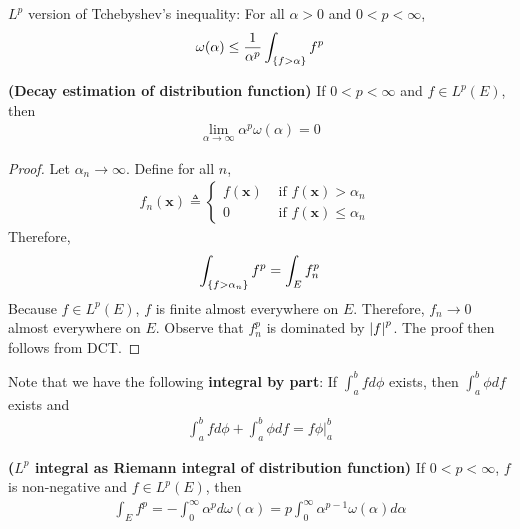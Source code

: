 \documentclass{report}
\begin{document}
\begin{mdframed}
$L^p$ version of Tchebyshev's inequality:  For all $\alpha >0$ and $0<p <\infty$, 
\begin{align*}
\omega (\alpha )\leq  \frac{1}{\alpha ^p}  \int_{\{ f>\alpha  \}}f^p
\end{align*}
\end{mdframed}
\begin{theorem}
\label{Deod}
 \textbf{(Decay estimation of distribution function)} If $0<p<\infty$ and $f\in L^p(E)$, then 
\begin{align*}
\lim_{\alpha \to \infty} \alpha ^p \omega (\alpha )=0 
\end{align*}
\end{theorem}
\begin{proof}
Let $\alpha_n \to \infty$. Define for all $n$, 
 \begin{align*}
f_n(\textbf{x})\triangleq \begin{cases}
  f(\textbf{x})& \text{ if $f(\textbf{x})>\alpha_n$ }\\
  0& \text{ if $f(\textbf{x})\leq \alpha_n$ }
\end{cases}
\end{align*}
Therefore,
\begin{align*}
\int_{\{ f>\alpha_n \}} f^p= \int_E f_{n}^p 
\end{align*}
Because $f\in L^p(E)$, $f$ is finite almost everywhere on $E$. Therefore, $f_n \to 0$ almost everywhere on $E$. Observe that $f_n^p$ is dominated by  $\left|f\right|^p$. The proof then follows from DCT. 
\end{proof}
\begin{mdframed}
Note that we have the following \textbf{integral by part}: If $\int_a^b fd\phi$ exists, then $\int_a^b \phi df$ exists and 
\begin{align*}
\int_a^b fd\phi + \int_a^b \phi df =  f \phi \Big|_{a}^b 
\end{align*}
\end{mdframed}
\begin{theorem}
\textbf{($L^p$ integral as Riemann integral of distribution function)} If $0<p<\infty$, $f$ is non-negative and $f\in L^p(E)$, then 
\begin{align*}
\int_E f^p = - \int_0^{\infty} \alpha^p d \omega (\alpha ) = p \int_0^{\infty} \alpha ^{p-1}\omega (\alpha )d\alpha 
\end{align*}
\end{theorem}
\end{document}
